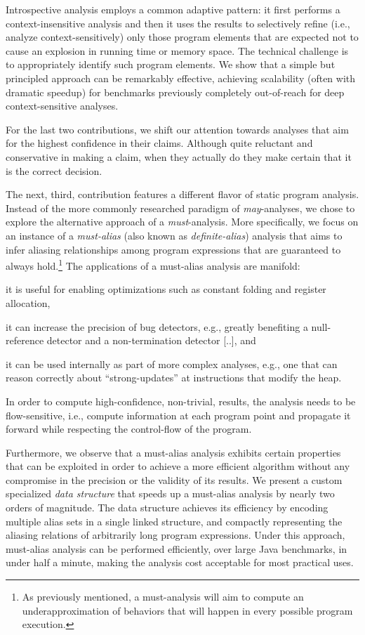 Introspective analysis employs a common adaptive pattern: it first performs a
context-insensitive analysis and then it uses the results to selectively refine
(i.e., analyze context-sensitively) only those program elements that are
expected not to cause an explosion in running time or memory space. The
technical challenge is to appropriately identify such program elements. We show
that a simple but principled approach can be remarkably effective, achieving
scalability (often with dramatic speedup) for benchmarks previously completely
out-of-reach for deep context-sensitive analyses.

For the last two contributions, we shift our attention towards analyses that
aim for the highest confidence in their claims. Although quite reluctant and
conservative in making a claim, when they actually do they make certain that it
is the correct decision.

 The next, third, contribution features a different flavor of static program
analysis. Instead of the more commonly researched paradigm of
\emph{may}-analyses, we chose to explore the alternative approach of a
\emph{must}-analysis. More specifically, we focus on an instance of a
\emph{must-alias} (also known as \emph{definite-alias}) analysis that aims to
infer aliasing relationships among program expressions that are guaranteed to
always hold.\footnote{As previously mentioned, a must-analysis will aim to
compute an underapproximation of behaviors that will happen in every possible
program execution.} The applications of a must-alias analysis are manifold:
\begin{inparaenum}[(1)]
\item it is useful for enabling optimizations such as constant folding and
	register allocation,
\item it can increase the precision of bug detectors, e.g., greatly benefiting a
	null-reference detector and a non-termination detector [..], and
\item it can be used internally as part of more complex analyses, e.g., one that
	can reason correctly about ``strong-updates'' at instructions that modify
	the heap.
\end{inparaenum}
In order to compute high-confidence, non-trivial, results, the
analysis needs to be flow-sensitive, i.e., compute information at each program
point and propagate it forward while respecting the control-flow of the
program.

Furthermore, we observe that a must-alias analysis exhibits certain properties
that can be exploited in order to achieve a more efficient algorithm without
any compromise in the precision or the validity of its results. We present a
custom specialized \emph{data structure} that speeds up a must-alias analysis
by nearly two orders of magnitude. The data structure achieves its efficiency
by encoding multiple alias sets in a single linked structure, and compactly
representing the aliasing relations of arbitrarily long program expressions.
Under this approach, must-alias analysis can be performed efficiently, over
large Java benchmarks, in under half a minute, making the analysis cost
acceptable for most practical uses.

